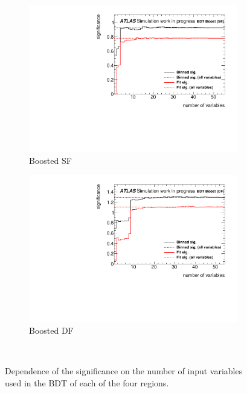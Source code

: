 \begin{figure}[htb]
\begin{subfigure}[t]{0.49\textwidth}
        \includegraphics[width=\textwidth]{./plots/mva/variable_reduction/BOOST_SF_sig_vs_nvars_all.pdf}
        \caption{Boosted SF}
    \end{subfigure}
    \begin{subfigure}[t]{0.49\textwidth}
        \includegraphics[width=\textwidth]{./plots/mva/variable_reduction/BOOST_DF_sig_vs_nvars_all.pdf}
        \caption{Boosted DF}
    \end{subfigure}
    \caption{Dependence of the significance on the number of input variables used in the BDT of each of the four regions.}~\label{fig:mva:varopt:sig_vs_nvars}
\end{figure}

